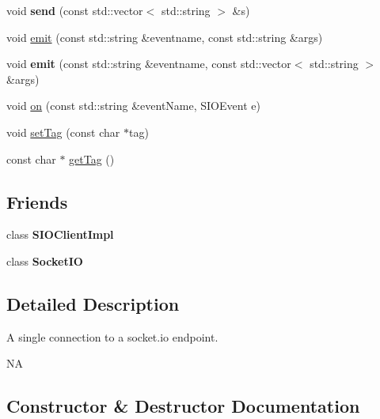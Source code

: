 \begin{DoxyCompactItemize}
void {\bfseries send} (const std\+::vector$<$ std\+::string $>$ \&s)
\item 
void \hyperlink{classnetwork_1_1SIOClient_a6467c540e8efb9c2f291746f0e0b7ab9}{emit} (const std\+::string \&eventname, const std\+::string \&args)
\item 
\mbox{\label{classnetwork_1_1SIOClient_a6e2735ce8c597adc46b38f9e6e97b712}} 
void {\bfseries emit} (const std\+::string \&eventname, const std\+::vector$<$ std\+::string $>$ \&args)
\item 
void \hyperlink{classnetwork_1_1SIOClient_af598d6039c7de3a591e628f754a38d9e}{on} (const std\+::string \&event\+Name, S\+I\+O\+Event e)
\item 
void \hyperlink{classnetwork_1_1SIOClient_a61511bcf1cfb9cd450ac7babd650c441}{set\+Tag} (const char $\ast$tag)
\item 
const char $\ast$ \hyperlink{classnetwork_1_1SIOClient_a4a3c602ea681844be68e158a95a0e75d}{get\+Tag} ()
\end{DoxyCompactItemize}
\subsection*{Friends}
\begin{DoxyCompactItemize}
\item 
\mbox{\label{classnetwork_1_1SIOClient_a377686538a58c24579aedab879d4b9db}} 
class {\bfseries S\+I\+O\+Client\+Impl}
\item 
\mbox{\label{classnetwork_1_1SIOClient_afd5ee524aa1969ca2242b05bf53cde85}} 
class {\bfseries Socket\+IO}
\end{DoxyCompactItemize}


\subsection{Detailed Description}
A single connection to a socket.\+io endpoint.

NA 

\subsection{Constructor \& Destructor Documentation}
\mbox{\label{classnetwork_1_1SIOClient_a21140a7daced6d272691187aba28fddf}} 
